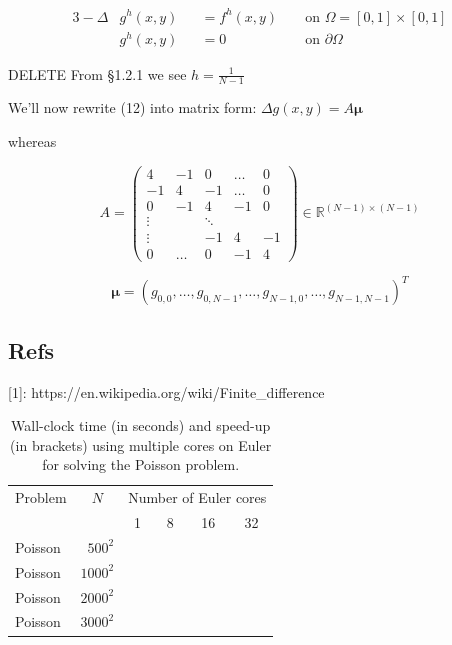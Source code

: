 \documentclass[unicode,11pt,a4paper,oneside,numbers=endperiod,openany]{scrartcl}
\begin{document}
\begin{alignat}{3}
  -\Delta &g^h(x, y) &&= f^h(x, y) &&\text{  on  } \Omega = [0,1] \times [0,1]\\
          &g^h(x, y) &&= 0 &&\text{  on  } \partial \Omega
\end{alignat}


DELETE
From §1.2.1 we see $h=\frac{1}{N-1}$

We'll now rewrite (12) into matrix form: $\Delta g(x,y) = A \mathbf{\mu}$

whereas

\begin{equation}
A = 
\begin{pmatrix}
   4 & -1 &  0 & \dots & 0 \\
  -1 &  4 & -1 & \dots & 0 \\    
   0 & -1 &  4 & -1 & 0 \\
   \vdots & & \ddots & & \\
   \vdots & & -1 &  4 & -1 \\
   0 & \dots &  0 & -1 & 4
\end{pmatrix}
\in \mathbb R^{(N-1) \times (N-1)}
\end{equation}

\begin{equation}
  \mathbf{\mu} = (g_{0,0},\dots,g_{0,N-1},\dots,g_{N-1,0},\dots,g_{N-1, N-1})^T
\end{equation}

\subsection{Refs}
[1]: https://en.wikipedia.org/wiki/Finite\_difference


\begin{table}[h]
	\caption{Wall-clock time (in seconds) and speed-up (in brackets) using multiple cores on Euler for solving the Poisson problem.}
	\centering
	
	\begin{tabular}{l|r||r|r|r|r}\hline\hline
		Problem & \multicolumn{1}{c||}{$N$} &  \multicolumn{4}{c}{Number of Euler cores} \\
		&       & \multicolumn{1}{c|}{1} & \multicolumn{1}{c|}{8} & \multicolumn{1}{c|}{16} & \multicolumn{1}{c}{32} \\
		\hline\hline
		{ Poisson} & $500^2$  &    \phantom{222222}        &    \phantom{222222}      & \phantom{222222}         &      \phantom{222222} \\
		{ Poisson} & $1000^2$ &            &          &          &       \\
		{ Poisson} & $2000^2$ &            &          &          &       \\
		{ Poisson} & $3000^2$ &            &          &          &       \\\hline \hline
	\end{tabular}
	
	\label{tab:PDEparallel1}
\end{table}
\end{document}
